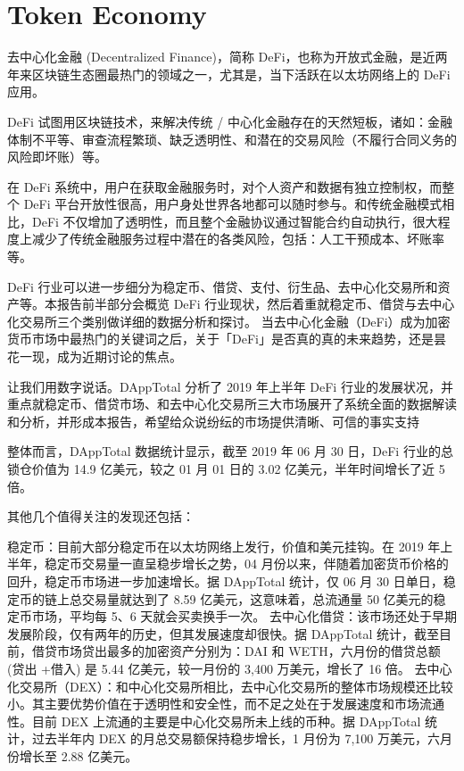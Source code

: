 \section{Token Economy}
去中心化金融 (Decentralized Finance)，简称 DeFi，也称为开放式金融，是近两年来区块链生态圈最热门的领域之一，尤其是，当下活跃在以太坊网络上的 DeFi 应用。

DeFi 试图用区块链技术，来解决传统 / 中心化金融存在的天然短板，诸如：金融体制不平等、审查流程繁琐、缺乏透明性、和潜在的交易风险（不履行合同义务的风险即坏账）等。

在 DeFi 系统中，用户在获取金融服务时，对个人资产和数据有独立控制权，而整个 DeFi 平台开放性很高，用户身处世界各地都可以随时参与。和传统金融模式相比，DeFi 不仅增加了透明性，而且整个金融协议通过智能合约自动执行，很大程度上减少了传统金融服务过程中潜在的各类风险，包括：人工干预成本、坏账率等。

DeFi 行业可以进一步细分为稳定币、借贷、支付、衍生品、去中心化交易所和资产等。本报告前半部分会概览 DeFi 行业现状，然后着重就稳定币、借贷与去中心化交易所三个类别做详细的数据分析和探讨。
当去中心化金融（DeFi）成为加密货币市场中最热门的关键词之后，关于「DeFi」是否真的真的未来趋势，还是昙花一现，成为近期讨论的焦点。

让我们用数字说话。DAppTotal 分析了 2019 年上半年 DeFi 行业的发展状况，并重点就稳定币、借贷市场、和去中心化交易所三大市场展开了系统全面的数据解读和分析，并形成本报告，希望给众说纷纭的市场提供清晰、可信的事实支持

整体而言，DAppTotal 数据统计显示，截至 2019 年 06 月 30 日，DeFi 行业的总锁仓价值为 14.9 亿美元，较之 01 月 01 日的 3.02 亿美元，半年时间增长了近 5 倍。

其他几个值得关注的发现还包括：

稳定币：目前大部分稳定币在以太坊网络上发行，价值和美元挂钩。在 2019 年上半年，稳定币交易量一直呈稳步增长之势，04 月份以来，伴随着加密货币价格的回升，稳定币市场进一步加速增长。据 DAppTotal 统计，仅 06 月 30 日单日，稳定币的链上总交易量就达到了 8.59 亿美元，这意味着，总流通量 50 亿美元的稳定币市场，平均每 5、6 天就会买卖换手一次。
去中心化借贷：该市场还处于早期发展阶段，仅有两年的历史，但其发展速度却很快。据 DAppTotal 统计，截至目前，借贷市场贷出最多的加密资产分别为：DAI 和 WETH，六月份的借贷总额 (贷出 +借入) 是 5.44 亿美元，较一月份的 3,400 万美元，增长了 16 倍。
去中心化交易所（DEX）：和中心化交易所相比，去中心化交易所的整体市场规模还比较小。其主要优势价值在于透明性和安全性，而不足之处在于发展速度和市场流通性。目前 DEX 上流通的主要是中心化交易所未上线的币种。据 DAppTotal 统计，过去半年内 DEX 的月总交易额保持稳步增长，1 月份为 7,100 万美元，六月份增长至 2.88 亿美元。


